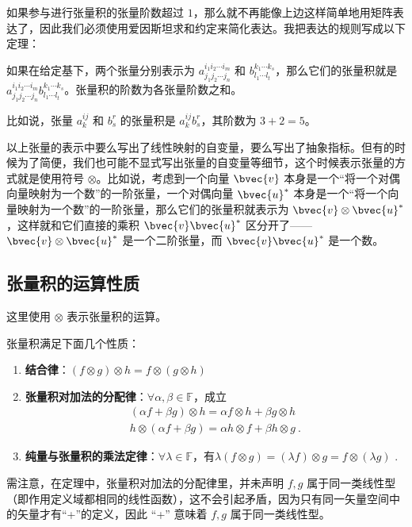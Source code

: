如果参与进行张量积的张量阶数超过 $1$，那么就不再能像上边这样简单地用矩阵表达了，因此我们必须使用爱因斯坦求和约定来简化表达。我把表达的规则写成以下定理：

\begin{theorem}{}
如果在给定基下，两个张量分别表示为 $a^{i_1i_2\cdots i_m}_{j_1j_2\cdots j_n}$ 和 $b^{k_1\cdots k_s}_{l_1\cdots l_t}$，那么它们的张量积就是 $a^{i_1i_2\cdots i_m}_{j_1j_2\cdots j_n}b^{k_1\cdots k_s}_{l_1\cdots l_t}$。张量积的阶数为各张量阶数之和。
\end{theorem}

比如说，张量 $a^{ij}_k$ 和 $b^r_s$ 的张量积是 $a^{ij}_kb^r_s$，其阶数为 $3+2=5$。

以上张量的表示中要么写出了线性映射的自变量，要么写出了抽象指标。但有的时候为了简便，我们也可能不显式写出张量的自变量等细节，这个时候表示张量的方式就是使用符号 $\otimes$。比如说，考虑到一个向量 $\bvec{v}$ 本身是一个“将一个对偶向量映射为一个数”的一阶张量，一个对偶向量 $\bvec{u}^*$ 本身是一个“将一个向量映射为一个数”的一阶张量，那么它们的张量积就表示为 $\bvec{v}\otimes\bvec{u}^*$，这样就和它们直接的乘积 $\bvec{v}\bvec{u}^*$ 区分开了——$\bvec{v}\otimes\bvec{u}^*$ 是一个二阶张量，而 $\bvec{v}\bvec{u}^*$ 是一个数。

\subsection{张量积的运算性质}
这里使用 $\otimes$ 表示张量积的运算。
\begin{theorem}{}\label{the_TsrPrd_1}
张量积满足下面几个性质：
\begin{enumerate}
\item \textbf{结合律}：$(f\otimes g)\otimes h=f\otimes (g\otimes h)$
\item \textbf{张量积对加法的分配律}：$\forall \alpha,\beta\in\mathbb F$，成立
\begin{equation}
\begin{aligned}
(\alpha f+\beta g)\otimes h=\alpha f\otimes h+\beta g\otimes h\\
h\otimes(\alpha f+\beta g)=\alpha h\otimes f+\beta h\otimes g~.
\end{aligned}
\end{equation}
\item \textbf{纯量与张量积的乘法定律}：$\forall \lambda\in\mathbb F$，有$\lambda (f\otimes g)=(\lambda f)\otimes g=f\otimes (\lambda g)$ .
\end{enumerate}
\end{theorem}
需注意，在定理中，张量积对加法的分配律里，并未声明 $f,g$ 属于同一类线性型（即作用定义域都相同的线性函数），这不会引起矛盾，因为只有同一矢量空间中的矢量才有“+”的定义，因此 “+” 意味着 $f,g$ 属于同一类线性型。

